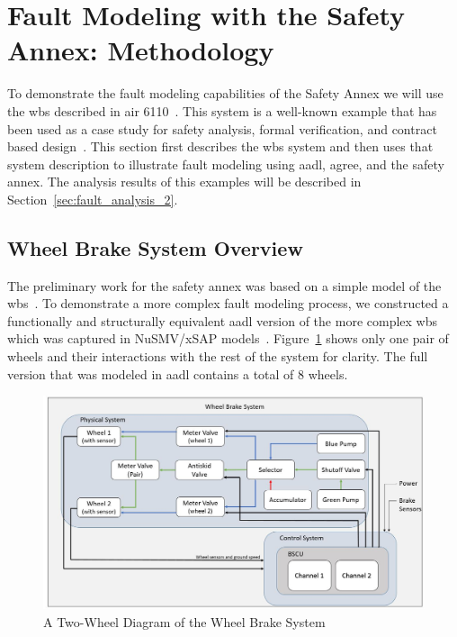 \section{Fault Modeling with the Safety Annex: Methodology}
\label{sec:fault_modeling}

To demonstrate the fault modeling capabilities of the Safety Annex we will use the \gls{wbs} described in \gls{air} 6110~\cite{AIR6110}.  This system is a well-known example that has been used as a case study for safety analysis, formal verification, and contract based design~\cite{DBLP:conf/cav/BozzanoCPJKPRT15, 10.1007/978-3-319-11936-6-7, CAV2015:BoCiGrMa, Joshi05:SafeComp}. This section first describes the \gls{wbs} system and then uses that system description to illustrate fault modeling using \gls{aadl}, \gls{agree}, and the safety annex. The analysis results of this examples will be described in Section~\ref{sec:fault_analysis_2}.

\subsection{Wheel Brake System Overview}
The preliminary work for the safety annex was based on a simple model of the \gls{wbs}~\cite{Stewart17:IMBSA}. To demonstrate a more complex fault modeling process, we constructed a functionally and structurally equivalent \gls{aadl} version of the more complex \gls{wbs} which was captured in NuSMV/xSAP models~\cite{DBLP:conf/cav/BozzanoCPJKPRT15}. Figure~\ref{fig:wbs} shows only one pair of wheels and their interactions with the rest of the system for clarity. The full version that was modeled in \gls{aadl} contains a total of 8 wheels.

\begin{figure}[h!]
	\centering
	\includegraphics[width=\textwidth]{images/wbs_arch4.jpg}
	\caption{A Two-Wheel Diagram of the Wheel Brake System}
	\label{fig:wbs}
\end{figure} 

